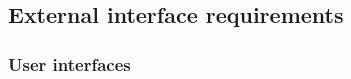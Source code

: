 






  \subsection{External interface requirements}
    \subsubsection{User interfaces}
    \label{sec:userinterfaces}
